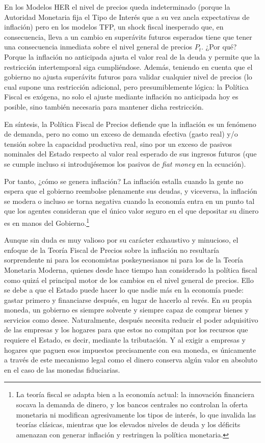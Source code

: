 \documentclass[10pt,a4paper]{article}
\begin{document}
En los Modelos HER el nivel de precios queda indeterminado (porque la Autoridad Monetaria fija el Tipo de Interés que a su vez ancla expectativas de inflación) pero en los modelos TFP, un shock fiscal inesperado que, en consecuencia, lleva a un cambio en superávits futuros esperados tiene que tener una consecuencia inmediata sobre el nivel general de precios $P_t$. ¿Por qué? Porque la inflación no anticipada ajusta el valor real de la deuda y permite que la restricción intertemporal siga cumpliéndose. Además, teniendo en cuenta que el gobierno no ajusta superávits futuros para validar cualquier nivel de precios (lo cual supone una restricción adicional, pero presumiblemente lógica: la Política Fiscal es exógena, no solo el ajuste mediante inflación no anticipada hoy es posible, sino también necesaria para mantener dicha restricción.

En síntesis, la Política Fiscal de Precios defiende que la inflación es un fenómeno de demanda, pero no como un exceso de demanda efectiva (gasto real) y/o tensión sobre la capacidad productiva real, sino por un exceso de pasivos nominales del Estado respecto al valor real esperado de sus ingresos futuros (que se cumple incluso si introdujésemos los pasivos de \textit{fiat money} en la ecuación). 

Por tanto, ¿cómo se genera inflación? La inflación estalla cuando la gente no espera que el gobierno reembolse plenamente sus deudas, y viceversa, la inflación se modera o incluso se torna negativa cuando la economía entra en un punto tal que los agentes consideran que el único valor seguro en el que depositar su dinero es en manos del Gobierno.\footnote{
La teoría fiscal se adapta bien a la economía actual: la innovación financiera socava la demanda de dinero, y los bancos centrales no controlan la oferta monetaria ni modifican agresivamente los tipos de interés, lo que invalida las teorías clásicas, mientras que los elevados niveles de deuda y los déficits amenazan con generar inflación y restringen la política monetaria. 
}

Aunque sin duda es muy valioso por su carácter exhaustivo y minucioso, el enfoque de la Teoría Fiscal de Precios sobre la inflación no resultaría sorprendente ni para los economistas poskeynesianos ni para los de la Teoría Monetaria Moderna, quienes desde hace tiempo han considerado la política fiscal como quizá el principal motor de los cambios en el nivel general de precios. Ello se debe a que el Estado puede hacer lo que nadie más en la economía puede: gastar primero y financiarse después, en lugar de hacerlo al revés. En su propia moneda, un gobierno es siempre solvente y siempre capaz de comprar bienes y servicios como desee. Naturalmente, después necesita reducir el poder adquisitivo de las empresas y los hogares para que estos no compitan por los recursos que requiere el Estado, es decir, mediante la tributación. Y al exigir a empresas y hogares que paguen esos impuestos precisamente con esa moneda, es únicamente a través de este mecanismo legal como el dinero conserva algún valor en absoluto en el caso de las monedas fiduciarias. 
\end{document}
